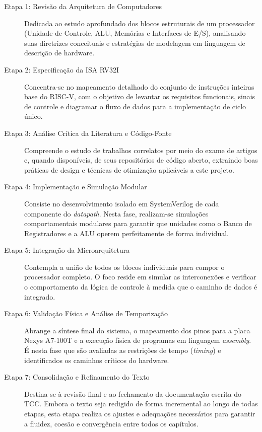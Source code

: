 \begin{description}
    \item[Etapa 1: Revisão da Arquitetura de Computadores] Dedicada ao estudo aprofundado dos blocos estruturais de um processador (Unidade de Controle, ALU, Memórias e Interfaces de E/S), analisando suas diretrizes conceituais e estratégias de modelagem em linguagem de descrição de hardware.
    
    \item[Etapa 2: Especificação da ISA RV32I] Concentra-se no mapeamento detalhado do conjunto de instruções inteiras base do RISC-V, com o objetivo de levantar os requisitos funcionais, sinais de controle e diagramar o fluxo de dados para a implementação de ciclo único.
    
    \item[Etapa 3: Análise Crítica da Literatura e Código-Fonte] Compreende o estudo de trabalhos correlatos por meio do exame de artigos e, quando disponíveis, de seus repositórios de código aberto, extraindo boas práticas de design e técnicas de otimização aplicáveis a este projeto.
    
    \item[Etapa 4: Implementação e Simulação Modular] Consiste no desenvolvimento isolado em SystemVerilog de cada componente do \textit{datapath}. Nesta fase, realizam-se simulações comportamentais modulares para garantir que unidades como o Banco de Registradores e a ALU operem perfeitamente de forma individual.
    
    \item[Etapa 5: Integração da Microarquitetura] Contempla a união de todos os blocos individuais para compor o processador completo. O foco reside em simular as interconexões e verificar o comportamento da lógica de controle à medida que o caminho de dados é integrado.
    
    \item[Etapa 6: Validação Física e Análise de Temporização] Abrange a síntese final do sistema, o mapeamento dos pinos para a placa Nexys A7-100T e a execução física de programas em linguagem \textit{assembly}. É nesta fase que são avaliadas as restrições de tempo (\textit{timing}) e identificados os caminhos críticos do hardware.
    
    \item[Etapa 7: Consolidação e Refinamento do Texto] Destina-se à revisão final e ao fechamento da documentação escrita do TCC. Embora o texto seja redigido de forma incremental ao longo de todas etapas, esta etapa realiza os ajustes e adequações necessários para garantir a fluidez, coesão e convergência entre todos os capítulos.
\end{description}

